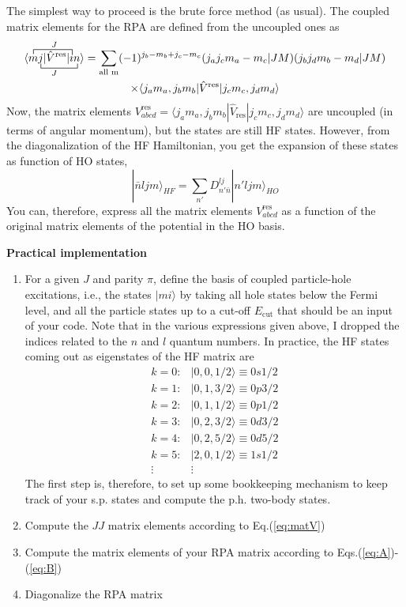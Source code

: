 The simplest way to proceed is the brute force method (as usual). The coupled 
matrix elements for the RPA are defined from the uncoupled ones as
\begin{multline}
\underset{J}{
\overset{J}{
\acontraction{\langle }{m }{j | \hat{V}^{\text{res}} | }{i}
\bcontraction{\langle m }{j}{| \hat{V}^{\text{res}} i | }{n}
\langle m j | \hat{V}^{\text{res}} | i n \rangle
}
}
=
\sum_{\text{all\ m}} (-1)^{j_{b}-m_{b}+j_{c}-m_{c}}
(j_{a}j_{c}m_{a}-m_{c}|JM)(j_{b}j_{d}m_{b}-m_{d}|JM) \\
\times\langle j_{a}m_{a},j_{b}m_{b} | \hat{V}^{\text{res}} | j_{c}m_{c},j_{d}m_{d}\rangle
\label{eq:matV}
\end{multline}
Now, the matrix elements $V^{\text{res}}_{abcd} = \langle j_{a}m_{a},j_{b}m_{b} | \hat{V}_{\text{res}} | j_{c}m_{c},j_{d}m_{d}\rangle$ 
are uncoupled (in terms of angular momentum), but the states are still HF 
states. However, from the diagonalization of the HF Hamiltonian, you get the 
expansion of these states as function of HO states,
\begin{equation}
|\bar{n}ljm\rangle_{HF} = \sum_{n'} D^{lj}_{n'\bar{n}} |n'ljm\rangle_{HO}
\end{equation}
You can, therefore, express all the matrix elements $V^{\text{res}}_{abcd}$ as 
a function of the original matrix elements of the potential in the HO basis. 

{\bf Practical implementation}
\begin{enumerate}
\item For a given $J$ and parity $\pi$, define the basis of coupled 
particle-hole excitations, i.e., the states $|mi\rangle$ by taking all hole 
states below the Fermi level, and all the particle states up to a cut-off 
$E_{\text{cut}}$ that should be an input of your code. Note that in the various 
expressions given above, I dropped the indices related to the $n$ and $l$ 
quantum numbers. In practice, the HF states coming out as eigenstates of the 
HF matrix are
\begin{eqnarray*}
k=0: & |0,0,1/2\rangle \equiv 0s1/2 \\
k=1: & |0,1,3/2\rangle \equiv 0p3/2 \\
k=2: & |0,1,1/2\rangle \equiv 0p1/2 \\
k=3: & |0,2,3/2\rangle \equiv 0d3/2 \\
k=4: & |0,2,5/2\rangle \equiv 0d5/2 \\
k=5: & |2,0,1/2\rangle \equiv 1s1/2 \\
\vdots & \vdots
\end{eqnarray*}
The first step is, therefore, to set up some bookkeeping mechanism to keep 
track of your s.p. states and compute the p.h. two-body states.
\item Compute the $JJ$ matrix elements according to Eq.(\ref{eq:matV})
\item Compute the matrix elements of your RPA matrix according to 
Eqs.(\ref{eq:A})-(\ref{eq:B})
\item Diagonalize the RPA matrix
\end{enumerate}
